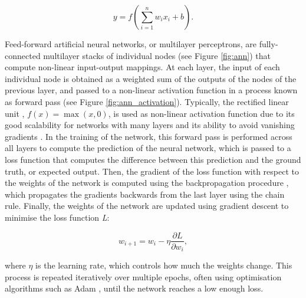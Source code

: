 \begin{equation}
    \textit{y} = \textit{f}\left ( \sum_{i=1}^{n} \textit{w}_i\textit{x}_i + \textit{b} \right ).
    \label{eq:perceptron}
\end{equation}


Feed-forward artificial neural networks, or multilayer perceptrons, are fully-connected multilayer stacks of individual nodes (see Figure \ref{fig:ann}) that compute non-linear input-output mappings. At each layer, the input of each individual node is obtained as a weighted sum of the outputs of the nodes of the previous layer, and passed to a non-linear activation function in a process known as forward pass (see Figure \ref{fig:ann_activation}). Typically, the rectified linear unit \citep[ReLU; ][]{nair2010}, $\textit{f}(\textit{x})=\max(\textit{x},0)$, is used as non-linear activation function due to its good scalability for networks with many layers and its ability to avoid vanishing gradients \citep{hochreiter1991}. In the training of the network, this forward pass is performed across all layers to compute the prediction of the neural network, which is passed to a loss function that computes the difference between this prediction and the ground truth, or expected output. Then, the gradient of the loss function with respect to the weights of the network is computed using the backpropagation procedure \citep{werbos1974,parker1985,lecun1985,rumelhart1986}, which propagates the gradients backwards from the last layer using the chain rule. Finally, the weights of the network are updated using gradient descent to minimise the loss function \textit{L}:

\begin{equation}
     \textit{w}_{i+1} = \textit{w}_i - \eta \frac{\partial \textit{L}}{\partial \textit{w}_i},
    \label{eq:backpropagation}
\end{equation}

where $\eta$ is the learning rate, which controls how much the weights change. This process is repeated iteratively over multiple epochs, often using optimisation algorithms such as Adam \citep{adam}, until the network reaches a low enough loss.


